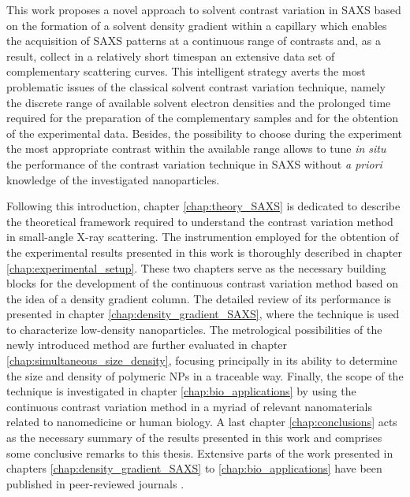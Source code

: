 This work proposes a novel approach to solvent contrast variation in SAXS based on the formation of a solvent density gradient within a capillary which enables the acquisition of SAXS patterns at a continuous range of contrasts and, as a result, collect in a relatively short timespan an extensive data set of complementary scattering curves. This intelligent strategy averts the most problematic issues of the classical solvent contrast variation technique, namely the discrete range of available solvent electron densities and the prolonged time required for the preparation of the complementary samples and for the obtention of the experimental data. Besides, the possibility to choose during the experiment the most appropriate contrast within the available range allows to tune \emph{in situ} the performance of the contrast variation technique in SAXS without \emph{a priori} knowledge of the investigated nanoparticles.

Following this introduction, chapter \ref{chap:theory_SAXS} is dedicated to describe the theoretical framework required to understand the contrast variation method in small-angle X-ray scattering. The instrumention employed for the obtention of the experimental results presented in this work is thoroughly described in chapter \ref{chap:experimental_setup}. These two chapters serve as the necessary building blocks for the development of the continuous contrast variation method based on the idea of a density gradient column. The detailed review of its performance is presented in chapter \ref{chap:density_gradient_SAXS}, where the technique is used to characterize low-density nanoparticles. The metrological possibilities of the newly introduced method are further evaluated in chapter \ref{chap:simultaneous_size_density}, focusing principally in its ability to determine the size and density of polymeric NPs in a traceable way. Finally, the scope of the technique is investigated in chapter \ref{chap:bio_applications} by using the continuous contrast variation method in a myriad of relevant nanomaterials related to nanomedicine or human biology. A last chapter \ref{chap:conclusions} acts as the necessary summary of the results presented in this work and comprises some conclusive remarks to this thesis. Extensive parts of the work presented in chapters \ref{chap:density_gradient_SAXS} to \ref{chap:bio_applications} have been published in peer-reviewed journals \citep{minelli_characterization_2014,garcia-diez_nanoparticle_2015,garcia-diez_size_2016,garcia-diez_simultaneous_2016-1}.




